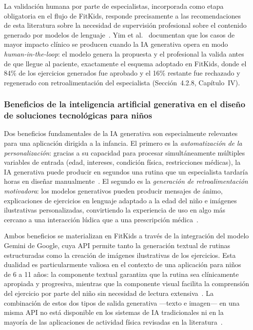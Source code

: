 					La validación humana por parte de especialistas, incorporada como etapa obligatoria en el flujo de FitKids, responde precisamente a las recomendaciones de esta literatura sobre la necesidad de supervisión profesional sobre el contenido generado por modelos de lenguaje~\cite{Pareek2025}. Yim et al.~\cite{Yim2024} documentan que los casos de mayor impacto clínico se producen cuando la IA generativa opera en modo \textit{human-in-the-loop}: el modelo genera la propuesta y el profesional la valida antes de que llegue al paciente, exactamente el esquema adoptado en FitKids, donde el 84\% de los ejercicios generados fue aprobado y el 16\% restante fue rechazado y regenerado con retroalimentación del especialista (Sección~4.2.8, Capítulo~IV).

				\subsubsection{Beneficios de la inteligencia artificial generativa en el diseño de soluciones tecnológicas para niños}
					Dos beneficios fundamentales de la IA generativa son especialmente relevantes para una aplicación dirigida a la infancia. El primero es la \textit{automatización de la personalización}: gracias a su capacidad para procesar simultáneamente múltiples variables de entrada (edad, intereses, condición física, restricciones médicas), la IA generativa puede producir en segundos una rutina que un especialista tardaría horas en diseñar manualmente~\cite{Sengar2024}. El segundo es la \textit{generación de retroalimentación motivadora}: los modelos generativos pueden producir mensajes de ánimo, explicaciones de ejercicios en lenguaje adaptado a la edad del niño e imágenes ilustrativas personalizadas, convirtiendo la experiencia de uso en algo más cercano a una interacción lúdica que a una prescripción médica~\cite{Cao2023}.
					
					Ambos beneficios se materializan en FitKids a través de la integración del modelo Gemini de Google, cuya API permite tanto la generación textual de rutinas estructuradas como la creación de imágenes ilustrativas de los ejercicios. Esta dualidad es particularmente valiosa en el contexto de una aplicación para niños de 6 a 11 años: la componente textual garantiza que la rutina sea clínicamente apropiada y progresiva, mientras que la componente visual facilita la comprensión del ejercicio por parte del niño sin necesidad de lectura extensiva~\cite{Hourcade2015}. La combinación de estos dos tipos de salida generativa ---texto e imagen--- en una misma API no está disponible en los sistemas de IA tradicionales ni en la mayoría de las aplicaciones de actividad física revisadas en la literatura~\cite{Sengar2024}.

